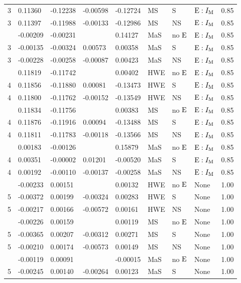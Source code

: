 \begin{longtable}[t]{lllllllll}
3 & 0.11360 & -0.12238 & -0.00598 & -0.12724 & MS & S & ${\rm E}:I_{{\rm M}}$ & 0.85\\
3 & 0.11397 & -0.11988 & -0.00133 & -0.12986 & MS & NS & ${\rm E}:I_{{\rm M}}$ & 0.85\\
\addlinespace
3 & -0.00209 & -0.00231 &  & 0.14127 & MaS & no ${\rm E}$ & ${\rm E}:I_{{\rm M}}$ & 0.85\\
3 & -0.00135 & -0.00324 & 0.00573 & 0.00358 & MaS & S & ${\rm E}:I_{{\rm M}}$ & 0.85\\
3 & -0.00228 & -0.00258 & -0.00087 & 0.00423 & MaS & NS & ${\rm E}:I_{{\rm M}}$ & 0.85\\
\addlinespace
4 & 0.11819 & -0.11742 &  & 0.00402 & HWE & no ${\rm E}$ & ${\rm E}:I_{{\rm M}}$ & 0.85\\
4 & 0.11856 & -0.11880 & 0.00081 & -0.13473 & HWE & S & ${\rm E}:I_{{\rm M}}$ & 0.85\\
4 & 0.11800 & -0.11762 & -0.00152 & -0.13549 & HWE & NS & ${\rm E}:I_{{\rm M}}$ & 0.85\\
\addlinespace
4 & 0.11834 & -0.11756 &  & 0.00383 & MS & no ${\rm E}$ & ${\rm E}:I_{{\rm M}}$ & 0.85\\
4 & 0.11876 & -0.11916 & 0.00094 & -0.13488 & MS & S & ${\rm E}:I_{{\rm M}}$ & 0.85\\
4 & 0.11811 & -0.11783 & -0.00118 & -0.13566 & MS & NS & ${\rm E}:I_{{\rm M}}$ & 0.85\\
\addlinespace
4 & 0.00183 & -0.00126 &  & 0.15879 & MaS & no ${\rm E}$ & ${\rm E}:I_{{\rm M}}$ & 0.85\\
4 & 0.00351 & -0.00002 & 0.01201 & -0.00520 & MaS & S & ${\rm E}:I_{{\rm M}}$ & 0.85\\
4 & 0.00192 & -0.00110 & -0.00137 & -0.00258 & MaS & NS & ${\rm E}:I_{{\rm M}}$ & 0.85\\
\addlinespace
5 & -0.00233 & 0.00151 &  & 0.00132 & HWE & no ${\rm E}$ & None & 1.00\\
5 & -0.00372 & 0.00199 & -0.00324 & 0.00283 & HWE & S & None & 1.00\\
5 & -0.00217 & 0.00166 & -0.00572 & 0.00161 & HWE & NS & None & 1.00\\
\addlinespace
5 & -0.00226 & 0.00159 &  & 0.00119 & MS & no ${\rm E}$ & None & 1.00\\
5 & -0.00365 & 0.00207 & -0.00312 & 0.00271 & MS & S & None & 1.00\\
5 & -0.00210 & 0.00174 & -0.00573 & 0.00149 & MS & NS & None & 1.00\\
\addlinespace
5 & -0.00119 & 0.00091 &  & -0.00015 & MaS & no ${\rm E}$ & None & 1.00\\
5 & -0.00245 & 0.00140 & -0.00264 & 0.00123 & MaS & S & None & 1.00\\

\end{longtable}
